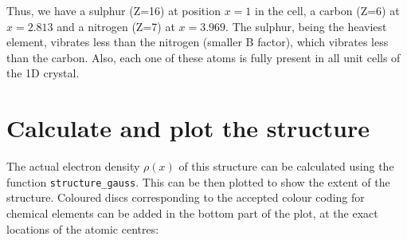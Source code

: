 \documentclass[12pt,a4paper]{article}\usepackage[]{graphicx}\usepackage[]{color}
\begin{document}
\noindent Thus, we have a sulphur (Z=16) at position $x=1$ in the cell, a carbon (Z=6) at $x=2.813$ and a nitrogen (Z=7) at $x=3.969$. The sulphur, being the heaviest element, vibrates less than the nitrogen (smaller B factor), which vibrates less than the carbon. Also, each one of these atoms is fully present in all unit cells of the 1D crystal.

\section{Calculate and plot the structure}
\noindent The actual electron density $\rho(x)$ of this structure can be calculated using the function \texttt{structure\_gauss}. This can be then plotted to show the extent of the structure. Coloured discs corresponding to the accepted colour coding for chemical elements can be added in the bottom part of the plot, at the exact locations of the atomic centres:
\end{document}
